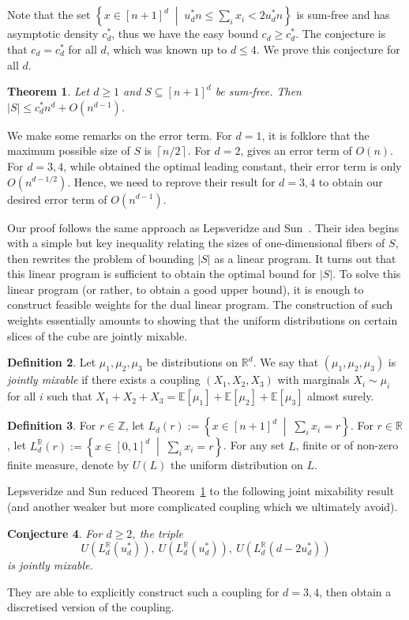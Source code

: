 \documentclass{article}
\newcommand{\ceil}[1]{\left\lceil #1 \right\rceil}
\newcommand{\setcond}[2]{\left\{ #1 \;\middle\vert\; #2 \right\}}
\newcommand{\EE}{\mathbb{E}}
\newcommand{\RR}{\mathbb{R}}
\newcommand{\ZZ}{\mathbb{Z}}
\newtheorem{thm}{Theorem}[section]
\newtheorem{conj}[thm]{Conjecture}
\theoremstyle{definition}
\newtheorem{defn}[thm]{Definition}
\begin{document}
Note that the set $\setcond{x\in [n+1]^d}{u_d^*n \leq \sum_i x_i<2u_d^*n}$ is sum-free and has asymptotic density $c_d^*$, thus we have the easy bound $c_d\geq c_d^*$. The conjecture is that $c_d=c_d^*$ for all $d$, which was known up to $d\leq 4$. We prove this conjecture for all $d$.

\begin{thm} \label{thm:main}
    Let $d\geq 1$ and $S\subseteq [n+1]^d$ be sum-free. Then $|S|\leq c_d^* n^d + O(n^{d-1})$.
\end{thm}

We make some remarks on the error term. For $d=1$, it is folklore that the maximum possible size of $S$ is $\ceil{n/2}$. For $d=2$, \cite{ER17} gives an error term of $O(n)$. For $d=3,4$, while \cite{LS23} obtained the optimal leading constant, their error term is only $O(n^{d-1/2})$. Hence, we need to reprove their result for $d=3,4$ to obtain our desired error term of $O(n^{d-1})$.

Our proof follows the same approach as Lepsveridze and Sun~\cite{LS23}. Their idea begins with a simple but key inequality relating the sizes of one-dimensional fibers of $S$, then rewrites the problem of bounding $|S|$ as a linear program. It turns out that this linear program is sufficient to obtain the optimal bound for $|S|$. To solve this linear program (or rather, to obtain a good upper bound), it is enough to construct feasible weights for the dual linear program. The construction of such weights essentially amounts to showing that the uniform distributions on certain slices of the cube are jointly mixable.

\begin{defn}
Let $\mu_1,\mu_2,\mu_3$ be distributions on $\RR^d$. We say that $(\mu_1,\mu_2,\mu_3)$ is \emph{jointly mixable} if there exists a coupling $(X_1,X_2,X_3)$ with marginals $X_i\sim \mu_i$ for all $i$ such that $X_1+X_2+X_3=\EE[\mu_1]+\EE[\mu_2]+\EE[\mu_3]$ almost surely.
\end{defn}

\begin{defn}
    For $r\in \ZZ$, let $L_{d}(r) := \setcond{x\in [n+1]^d}{\sum_i x_i = r}$. For $r\in \RR$, let $L_d^\RR(r) := \setcond{x\in [0,1]^d}{\sum_i x_i = r}$. For any set $L$, finite or of non-zero finite measure, denote by $U(L)$ the uniform distribution on $L$.
\end{defn}

Lepsveridze and Sun reduced Theorem~\ref{thm:main} to the following joint mixability result (and another weaker but more complicated coupling which we ultimately avoid).
\begin{conj}
    For $d\geq 2$, the triple
    \[U(L_d^\RR(u_d^*)),\ U(L_d^\RR(u_d^*)),\ U(L_d^\RR(d-2u_d^*))\]
    is jointly mixable.
\end{conj}
They are able to explicitly construct such a coupling for $d=3,4$, then obtain a discretised version of the coupling.
\end{document}
